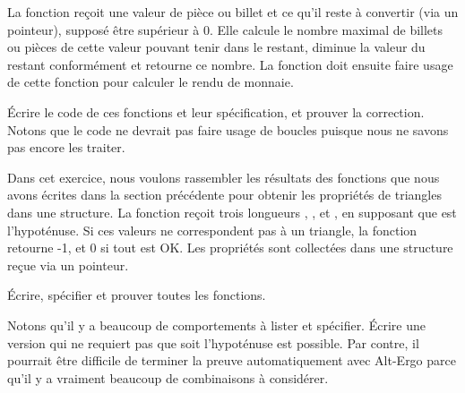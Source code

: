 

La fonction  reçoit une valeur de pièce ou
billet et ce qu'il reste à convertir (via un pointeur), supposé être
supérieur à 0. Elle calcule le nombre maximal de billets ou pièces de cette
valeur pouvant tenir dans le restant, diminue la valeur du restant
conformément et retourne ce nombre. La fonction 
doit ensuite faire usage de cette fonction pour calculer le rendu de
monnaie.


Écrire le code de ces fonctions et leur spécification, et prouver la
correction. Notons que le code ne devrait pas faire usage de boucles
puisque nous ne savons pas encore les traiter.




Dans cet exercice, nous voulons rassembler les résultats des fonctions
que nous avons écrites dans la section précédente pour obtenir les
propriétés de triangles dans une structure. La fonction
 reçoit trois longueurs ,
, et , en supposant que  est
l'hypoténuse. Si ces valeurs ne correspondent pas à un triangle, la
fonction retourne -1, et 0 si tout est OK. Les propriétés sont
collectées dans une structure  reçue via un pointeur.




Écrire, spécifier et prouver toutes les fonctions.

Notons qu'il y a beaucoup de comportements à lister et spécifier.
Écrire une version qui ne requiert pas que  soit
l'hypoténuse est possible. Par contre, il pourrait être difficile
de terminer la preuve automatiquement avec Alt-Ergo parce qu'il y a
vraiment beaucoup de combinaisons à considérer.
